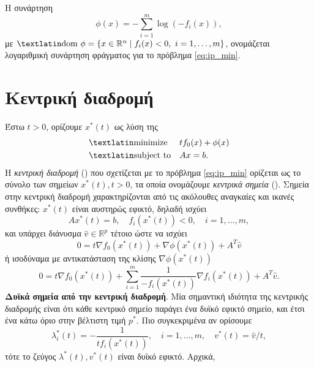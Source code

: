 Η συνάρτηση
\begin{equation*}
    \phi(x) = - \sum_{i=1}^m \log{(-f_i(x))},
\end{equation*}
με \( \text{\tl{dom}}\ \phi = \{ x \in \mathbb{R}^n \mid f_i (x) < 0,\ i= 1,
\dots, m \} \), ονομάζεται λογαριθμική συνάρτηση φράγματος για το πρόβλημα
\eqref{eq:ip_min}.

\section{Κεντρική διαδρομή}
Έστω \( t > 0 \), ορίζουμε \( x^*(t) \) ως λύση της
\begin{equation*}
    \begin{aligned}
        & \text{\tl{minimize}}
        & & tf_0(x) + \phi(x) \\
        & \text{\tl{subject to}}
        & & Ax = b.
    \end{aligned}
\end{equation*}
Η \emph{κεντρική διαδρομή} () που σχετίζεται με το πρόβλημα
\eqref{eq:ip_min} ορίζεται ως το σύνολο των σημείων \( x^*(t), t > 0 \), τα
οποία ονομάζουμε \emph{κεντρικά σημεία} (). Σημεία στην
κεντρική διαδρομή χαρακτηρίζονται από τις ακόλουθες αναγκαίες και ικανές
συνθήκες: \( x^*(t) \) είναι αυστηρώς εφικτό, δηλαδή ισχύει
\begin{equation*}
    Ax^*(t) = b, \quad f_i(x^*(t)) < 0, \quad i = 1,\dots, m,
\end{equation*}
και υπάρχει διάνυσμα \( \hat{v} \in \mathbb{R}^p \) τέτοιο ώστε
να ισχύει
\begin{equation*}
    0 = t\nabla f_0 (x^*(t)) + \nabla \phi (x^*(t)) + A^T \hat{v}
\end{equation*}
ή ισοδύναμα με αντικατάσταση της κλίσης \( \nabla \phi (x^*(t)) \)
\begin{equation}\label{eq:ip_cpc}
    0 = t\nabla f_0 (x^*(t)) + \sum_{i = 1}^m \dfrac{1}{-f_i(x^*(t))} \nabla f_i
    (x^*(t)) + A^T \hat{v}.
\end{equation}
\textbf{Δυϊκά σημεία από την κεντρική διαδρομή}. Μία σημαντική ιδιότητα της
κεντρικής διαδρομής είναι ότι κάθε κεντρικό σημείο
παράγει ένα δυϊκό εφικτό σημείο, και έτσι ένα κάτω όριο στην βέλτιστη τιμή
\( p^* \). Πιο συγκεκριμένα αν ορίσουμε
\begin{equation*}
    \lambda_i^*(t) = - \dfrac{1}{t f_i(x^*(t))},\quad i = 1, \dots, m,
    \quad v^*(t) = \hat{v}/t,
\end{equation*}
τότε το ζεύγος \( \lambda^*(t), v^*(t) \) είναι δυϊκό εφικτό. Αρχικά,
